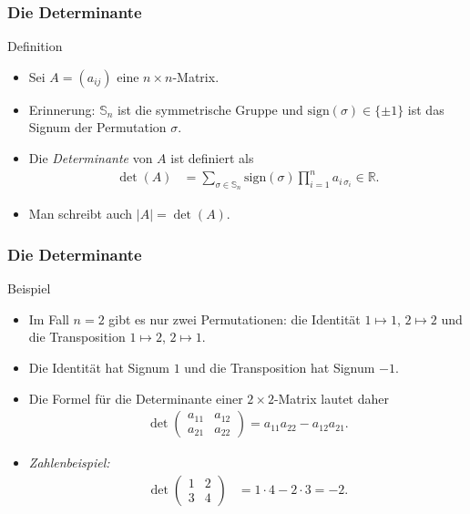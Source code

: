 \documentclass{beamer}
\title[Linadi]{\mytitle}
\author[Amin Coja-Oghlan]{Amin Coja-Oghlan}
\institute[Frankfurt]{JWGUFFM}
\date{}
\renewcommand{\emph}[1]{{\textcolor{solarizedRed}{\itshape #1}}}
\newcommand\RR{\mathbb R}
\renewcommand\SS{\mathbb S}
\newcommand\sign{\mathrm{sign}}
\renewcommand{\ae}{\"a}
\newcommand{\ue}{\"u}
\newcommand{\mytitle}{Die Determinante}
\begin{document}
\frame[plain]{\titlepage}

\begin{frame}\frametitle{\mytitle}
	\begin{block}{Definition}
		\begin{itemize}
			\item Sei $A=(a_{ij})$ eine $n\times n$-Matrix.
			\item \alert{Erinnerung:} $\SS_n$ ist die symmetrische Gruppe und $\sign(\sigma)\in\{\pm1\}$ ist das Signum der Permutation $\sigma$.
			\item Die \emph{Determinante} von $A$ ist definiert als
				\begin{align*}
					\det(A)&=\sum_{\sigma\in\SS_n}\sign(\sigma)\prod_{i=1}^n a_{i\,\sigma_i}\in\RR.
				\end{align*}
			\item Man schreibt auch $|A|=\det(A)$.
		\end{itemize}
	\end{block}
\end{frame}

\begin{frame}\frametitle{\mytitle}
	\begin{block}{Beispiel}
		\begin{itemize}
			\item Im Fall $n=2$ gibt es nur zwei Permutationen: die Identit\ae t $1\mapsto 1$, $2\mapsto 2$ und die Transposition $1\mapsto 2$, $2\mapsto 1$.
			\item Die Identit\ae t hat Signum $1$ und die Transposition hat Signum $-1$.
			\item Die Formel f\ue r die Determinante einer $2\times 2$-Matrix lautet daher
				\begin{align*}
					\det\begin{pmatrix} a_{11}&a_{12}\\a_{21}&a_{22} \end{pmatrix}=a_{11}a_{22}-a_{12}a_{21}.
				\end{align*}
			\item \emph{Zahlenbeispiel:}
				\begin{align*}
					\det\begin{pmatrix}1&2\\3&4\end{pmatrix}&=1\cdot 4-2\cdot 3=-2.
				\end{align*}
		\end{itemize}
	\end{block}
\end{frame}
\end{document}
